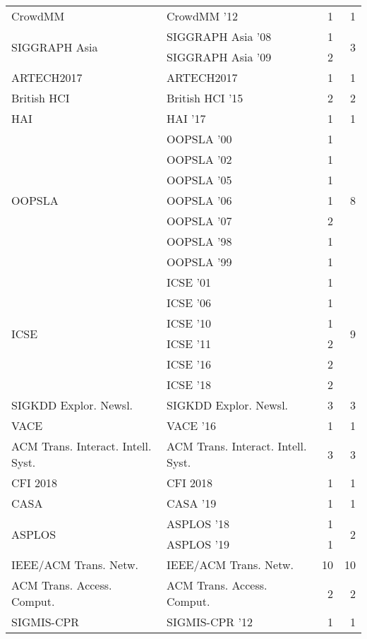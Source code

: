 \begin{table*}[t]
\begin{tabular}{llrr}
\multirow{1}{*}{CrowdMM } & CrowdMM '12 & 1 & \multirow{1}{*}{1}\\
\multirow{2}{*}{SIGGRAPH Asia } & SIGGRAPH Asia '08 & 1 & \multirow{2}{*}{3}\\
& SIGGRAPH Asia '09 & 2 &\\
\multirow{1}{*}{ARTECH2017} & ARTECH2017 & 1 & \multirow{1}{*}{1}\\
\multirow{1}{*}{British HCI } & British HCI '15 & 2 & \multirow{1}{*}{2}\\
\multirow{1}{*}{HAI } & HAI '17 & 1 & \multirow{1}{*}{1}\\
\multirow{7}{*}{OOPSLA } & OOPSLA '00 & 1 & \multirow{7}{*}{8}\\
& OOPSLA '02 & 1 &\\
& OOPSLA '05 & 1 &\\
& OOPSLA '06 & 1 &\\
& OOPSLA '07 & 2 &\\
& OOPSLA '98 & 1 &\\
& OOPSLA '99 & 1 &\\
\multirow{6}{*}{ICSE } & ICSE '01 & 1 & \multirow{6}{*}{9}\\
& ICSE '06 & 1 &\\
& ICSE '10 & 1 &\\
& ICSE '11 & 2 &\\
& ICSE '16 & 2 &\\
& ICSE '18 & 2 &\\
\multirow{1}{*}{SIGKDD Explor. Newsl.} & SIGKDD Explor. Newsl. & 3 & \multirow{1}{*}{3}\\
\multirow{1}{*}{VACE } & VACE '16 & 1 & \multirow{1}{*}{1}\\
\multirow{1}{*}{ACM Trans. Interact. Intell. Syst.} & ACM Trans. Interact. Intell. Syst. & 3 & \multirow{1}{*}{3}\\
\multirow{1}{*}{CFI 2018} & CFI 2018 & 1 & \multirow{1}{*}{1}\\
\multirow{1}{*}{CASA } & CASA '19 & 1 & \multirow{1}{*}{1}\\
\multirow{2}{*}{ASPLOS } & ASPLOS '18 & 1 & \multirow{2}{*}{2}\\
& ASPLOS '19 & 1 &\\
\multirow{1}{*}{IEEE/ACM Trans. Netw.} & IEEE/ACM Trans. Netw. & 10 & \multirow{1}{*}{10}\\
\multirow{1}{*}{ACM Trans. Access. Comput.} & ACM Trans. Access. Comput. & 2 & \multirow{1}{*}{2}\\
\multirow{1}{*}{SIGMIS-CPR } & SIGMIS-CPR '12 & 1 & \multirow{1}{*}{1}\\

\end{tabular}
\end{table*}
